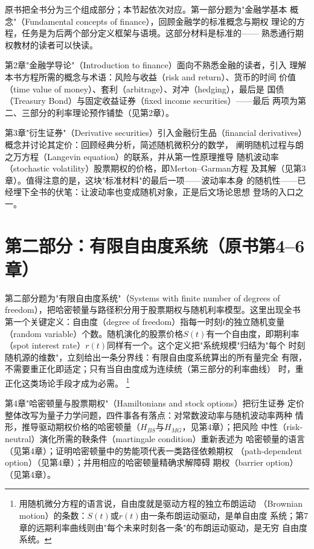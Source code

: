 原书把全书分为三个组成部分；本节起依次对应。第一部分题为"金融学基本
概念"（Fundamental concepts of finance），回顾金融学的标准概念与期权
理论的方程，任务是为后两个部分定义框架与语境。这部分材料是标准的——
熟悉通行期权教材的读者可以快读。

第2章"金融学导论"（Introduction to finance）面向不熟悉金融的读者，引入
理解本书方程所需的概念与术语：风险与收益（risk and return）、货币的时间
价值（time value of money）、套利（arbitrage）、对冲（hedging），最后是
国债（Treasury Bond）与固定收益证券（fixed income securities）——最后
两项为第二、三部分的利率理论预作铺垫（见第2章）。

第3章"衍生证券"（Derivative securities）引入金融衍生品（financial
derivatives）概念并讨论其定价：回顾经典分析，简述随机微积分的数学，
阐明随机过程与朗之万方程（Langevin equation）的联系，并从第一性原理推导
随机波动率（stochastic volatility）股票期权的价格，即Merton--Garman方程
及其解（见第3章）。值得注意的是，这块"标准材料"的最后一项——波动率本身
的随机性——已经埋下全书的伏笔：让波动率也变成随机对象，正是后文场论思想
登场的入口之一。

\section{第二部分：有限自由度系统（原书第4--6章）}

第二部分题为"有限自由度系统"（Systems with finite number of degrees of
freedom），把哈密顿量与路径积分用于股票期权与随机利率模型。这里出现全书
第一个关键定义：自由度（degree of freedom）指每一时刻$t$的独立随机变量
（random variable）个数。随机演化的股票价格$S(t)$有一个自由度，即期利率
（spot interest rate）$r(t)$同样有一个。这个定义把"系统规模"归结为"每个
时刻随机源的维数"，立刻给出一条分界线：有限自由度系统算出的所有量完全
有限，不需要重正化即适定；只有当自由度成为连续统（第三部分的利率曲线）
时，重正化这类场论手段才成为必需。
\footnote{用随机微分方程的语言说，自由度就是驱动方程的独立布朗运动
（Brownian motion）的条数：$S(t)$或$r(t)$由一条布朗运动驱动，是单自由度
系统；第7章的远期利率曲线则由"每个未来时刻各一条"的布朗运动驱动，是无穷
自由度系统。}

第4章"哈密顿量与股票期权"（Hamiltonians and stock options）把衍生证券
定价整体改写为量子力学问题，四件事各有落点：对常数波动率与随机波动率两种
情形，推导驱动期权价格的哈密顿量（$H_{BS}$与$H_{MG}$，见第4章）；把风险
中性（risk-neutral）演化所需的鞅条件（martingale condition）重新表述为
哈密顿量的语言（见第4章）；证明哈密顿量中的势能项代表一类路径依赖期权
（path-dependent option）（见第4章）；并用相应的哈密顿量精确求解障碍
期权（barrier option）（见第4章）。


